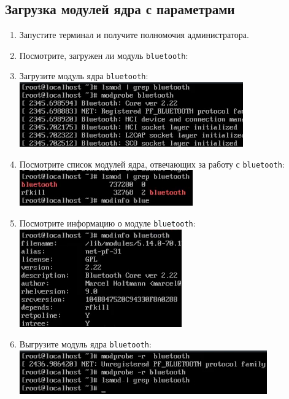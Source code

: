 \documentclass[12pt]{article}
\begin{document}
\subsection{Загрузка модулей ядра с параметрами}
\begin{enumerate}
	\item Запустите терминал и получите полномочия администратора.
	\item Посмотрите, загружен ли модуль \texttt{bluetooth}:
	\item Загрузите модуль ядра \texttt{bluetooth}:
	      \\\includegraphics{8.png}
	\item Посмотрите список модулей ядра, отвечающих за работу с \texttt{bluetooth}:
	      \\\includegraphics{9.png}
	\item Посмотрите информацию о модуле \texttt{bluetooth}:
	      \\\includegraphics{10.png}
	\item Выгрузите модуль ядра \texttt{bluetooth}:
	      \\\includegraphics{11.png}
\end{enumerate}
\end{document}
